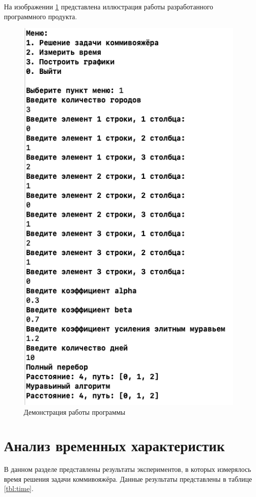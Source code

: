 На изображении \ref{img:demonstration} представлена иллюстрация работы разработанного программного продукта. 
\clearpage
\begin{figure}[h]
	\centering
	\includegraphics[height=0.6\textheight]{img/example.png}
	\caption{Демонстрация работы программы}
	\label{img:demonstration}
\end{figure}



\clearpage
\section{Анализ временных характеристик}

В данном разделе представлены результаты экспериментов, в которых измерялось время решения задачи коммивояжёра. 
Данные результаты представлены в таблице \ref{tbl:time}.

